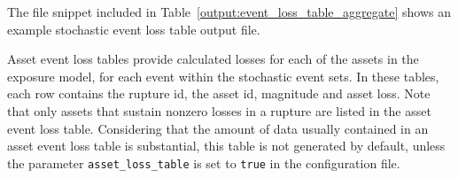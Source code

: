 The file snippet included in Table~\ref{output:event_loss_table_aggregate}
shows an example stochastic event loss table output file.




Asset event loss tables provide calculated losses for each of the assets in
the exposure model, for each event within the stochastic event sets. In these
tables, each row contains the rupture id, the asset id, magnitude and asset
loss. Note that only assets that sustain nonzero losses in a rupture are
listed in the asset event loss table. Considering that the amount of data
usually contained in an asset event loss table is substantial, this table is
not generated by default, unless the parameter \Verb+asset_loss_table+ is set
to \Verb+true+ in the configuration file.
